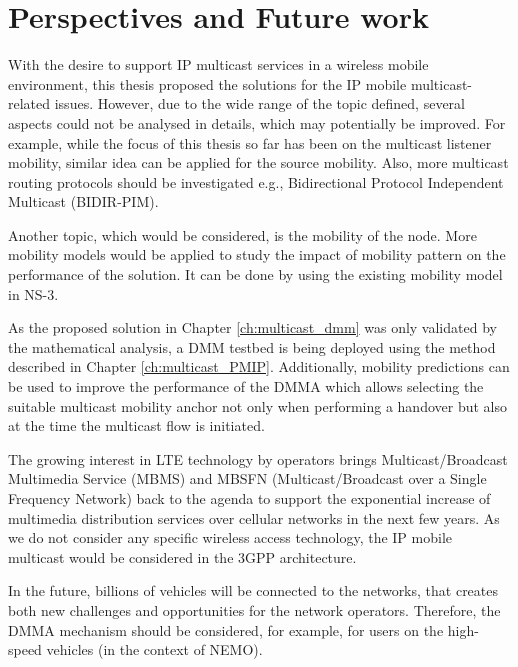 \section{Perspectives and Future work}
With the desire to support IP multicast services in a wireless mobile environment, this thesis proposed the solutions for the IP mobile multicast-related issues. However, due to the wide range of the topic defined, several aspects could not be analysed in details, which may potentially be improved. For example, while the focus of this thesis so far has been on the multicast listener mobility, similar idea can be applied for the source mobility. Also, more multicast routing protocols should be investigated e.g., Bidirectional Protocol Independent Multicast (BIDIR-PIM).

Another topic, which would be considered, is the mobility of the node. More mobility models would be applied to study the impact of mobility pattern on the performance of the solution. It can be done by using the existing mobility model in NS-3.

As the proposed solution in Chapter \ref{ch:multicast_dmm} was only validated by the mathematical analysis, a DMM testbed is being deployed using the method described in Chapter \ref{ch:multicast_PMIP}. Additionally, mobility predictions can be used to improve the performance of the DMMA which allows selecting the suitable multicast mobility anchor not only when performing a handover but also at the time the multicast flow is initiated. 

The growing interest in LTE technology by operators brings Multicast/Broadcast Multimedia Service (MBMS) and MBSFN (Multicast/Broadcast over a Single Frequency Network) back to the agenda to support the exponential increase of multimedia distribution services over cellular networks in the next few years. As we do not consider any specific wireless access technology, the IP mobile multicast would be considered in the 3GPP architecture.  
 
In the future, billions of vehicles will be connected to the networks, that creates both new challenges and opportunities for the network operators. Therefore, the DMMA mechanism should be considered, for example, for users on the high-speed vehicles (in the context of NEMO).

